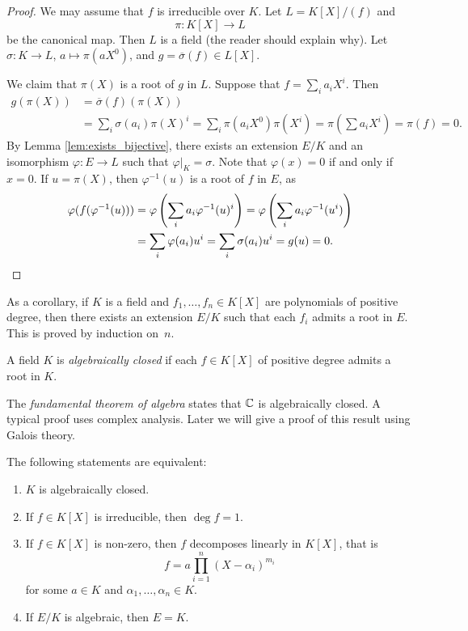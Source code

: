 \begin{proof}
	We may assume that $f$ is irreducible over $K$. Let $L=K[X]/(f)$ and 
	\[
    \pi\colon K[X]\to L
    \]
    be the canonical map. Then $L$ 
	is a field (the reader should explain why). 
	Let $\sigma\colon K\to L$, $a\mapsto \pi(aX^0)$, and 
	$g=\overline{\sigma}(f)\in L[X]$. 

	We claim that $\pi(X)$ is a root of $g$ in $L$. Suppose that $f=\sum_i a_iX^i$. 
	Then 
	\begin{align*}
		g(\pi(X))&=\overline{\sigma}(f)(\pi(X))\\
		&=\sum_i \sigma(a_i)\pi(X)^i
		=\sum_i\pi(a_iX^0)\pi(X^i)=\pi(\sum a_iX^i)=\pi(f)=0.
	\end{align*}
    By Lemma \ref{lem:exists_bijective},  
	there exists an extension $E/K$ and an isomorphism $\varphi\colon E\to L$
	such that $\varphi|_K=\sigma$. Note that
	$\varphi(x)=0$ if and only if $x=0$. If $u=\pi(X)$, then $\varphi^{-1}(u)$ is a root of $f$ in $E$, 
	as 
	\begin{align*}
		\varphi(f(\varphi^{-1}(u)))&=\varphi\left(\sum_ia_i\varphi^{-1}(u)^i\right)
		=\varphi\left(\sum_ia_i\varphi^{-1}(u^i)\right)\\
		&=\sum_i\varphi(a_i)u^i=\sum_i\sigma(a_i)u^i=g(u)=0.\qedhere
	\end{align*}
\end{proof}

As a corollary, if $K$ is a field and $f_1,\dots,f_n\in K[X]$ are polynomials 
of positive degree, then there exists an extension $E/K$  such that 
each $f_i$ admits a root in $E$. This is proved by induction on~$n$.  

\begin{definition}
	A field $K$ is \emph{algebraically closed} if each $f\in K[X]$ 
	of positive degree admits a root in $K$. 
\end{definition}

The \emph{fundamental theorem of algebra} states that $\mathbb{C}$ is algebraically closed. A
typical proof uses complex analysis.  Later we will give a proof of this result
using Galois theory. 

\begin{proposition}
	The following statements are equivalent:
	\begin{enumerate}
		\item $K$ is algebraically closed.
		\item If $f\in K[X]$ is irreducible, then $\deg f=1$.
		\item If $f\in K[X]$ is non-zero, then $f$ decomposes linearly in $K[X]$, that is
			\[
				f=a\prod_{i=1}^n(X-\alpha_i)^{m_i}
			\]
			for some $a\in K$ and $\alpha_1,\dots,\alpha_n\in K$. 
		\item If $E/K$ is algebraic, then $E=K$. 
	\end{enumerate}
\end{proposition}

